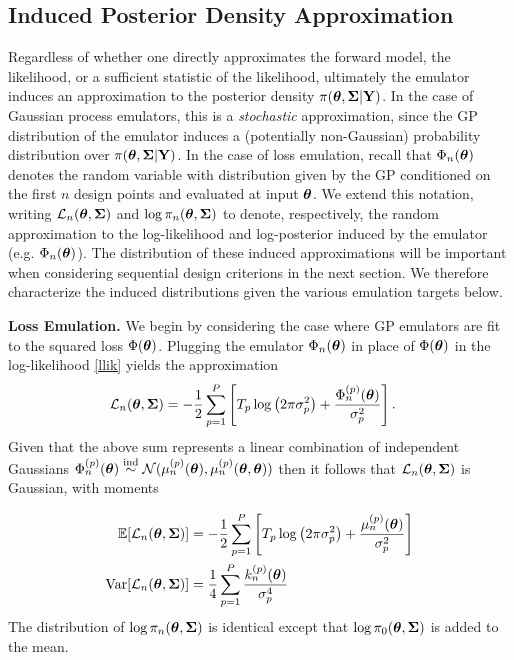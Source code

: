 \documentclass[12pt]{article}
\begin{document}
\subsection{Induced Posterior Density Approximation}
Regardless of whether one directly approximates the forward model, the likelihood, or a sufficient statistic of the likelihood, ultimately the emulator induces an approximation to the posterior 
density $\pi(\boldsymbol{\theta}, \boldsymbol{\Sigma}|\mathbf{Y})$. In the case of Gaussian process emulators, this is a \textit{stochastic} approximation, since the GP distribution of the emulator induces 
a (potentially non-Gaussian) probability distribution over $\pi(\boldsymbol{\theta}, \boldsymbol{\Sigma}|\mathbf{Y})$. In the case of loss emulation, recall that $\Phi_{n}(\boldsymbol{\theta})$ denotes the random 
variable with distribution given by the GP conditioned on the first $n$ design points and evaluated at input $\boldsymbol{\theta}$. We extend this notation, writing $\mathcal{L}_{n}(\boldsymbol{\theta}, \boldsymbol{\Sigma})$ and 
$\log \pi_{n}(\boldsymbol{\theta}, \boldsymbol{\Sigma})$ to denote, respectively, the random approximation to the log-likelihood and log-posterior induced by the emulator (e.g. $\Phi_n(\boldsymbol{\theta})$). The distribution of 
these induced approximations will be important when considering sequential design criterions in the next section. We therefore characterize the induced distributions given the various emulation 
targets below. 

\bigskip
\noindent
\textbf{Loss Emulation.} We begin by considering the case where GP emulators are fit to the squared loss $\Phi(\boldsymbol{\theta})$. Plugging the emulator $\Phi_n(\boldsymbol{\theta})$ in place of $\Phi(\boldsymbol{\theta})$ in the log-likelihood
\ref{llik} yields the approximation 
\begin{align*}
\mathcal{L}_{n}(\boldsymbol{\theta}, \boldsymbol{\Sigma}) &= -\frac{1}{2} \sum_{p = 1}^{P} \left[T_{p} \log\left(2\pi \sigma_{p}^2 \right) + \frac{\Phi_{n}^{(p)}(\boldsymbol{\theta})}{\sigma_{p}^2} \right].
\end{align*}
Given that the above sum represents a linear combination of independent Gaussians 
$\Phi_{n}^{(p)}(\boldsymbol{\theta}) \overset{\text{ind}}{\sim} \mathcal{N}(\mu_{n}^{(p)}(\boldsymbol{\theta}), \mu_{n}^{(p)}(\boldsymbol{\theta}, \boldsymbol{\theta}))$ then it follows that 
$\mathcal{L}_{n}(\boldsymbol{\theta}, \boldsymbol{\Sigma})$ is Gaussian, with moments 

\begin{align}
\mathbb{E}[\mathcal{L}_{n}(\boldsymbol{\theta}, \boldsymbol{\Sigma})] &= -\frac{1}{2} \sum_{p = 1}^{P} \left[T_{p} \log\left(2\pi \sigma_{p}^2 \right) + \frac{\mu_{n}^{(p)}(\boldsymbol{\theta})}{\sigma_{p}^2} \right] \\
\mathrm{Var}[\mathcal{L}_{n}(\boldsymbol{\theta}, \boldsymbol{\Sigma})] &= \frac{1}{4} \sum_{p = 1}^{P} \frac{k_{n}^{(p)}(\boldsymbol{\theta})}{\sigma_{p}^4}
\end{align}
The distribution of $\log \pi_{n}(\boldsymbol{\theta}, \boldsymbol{\Sigma})$ is identical except that $\log \pi_0(\boldsymbol{\theta}, \boldsymbol{\Sigma})$ is added to the mean. 
\end{document}
